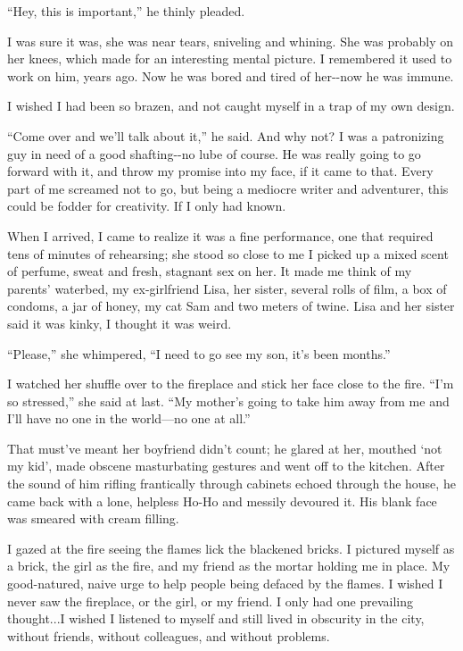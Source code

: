 ``Hey, this is important,'' he thinly pleaded.

I was sure it was, she was near tears, sniveling and whining. She was
probably on her knees, which made for an interesting mental picture. I
remembered it used to work on him, years ago. Now he was bored and tired
of her-\/-now he was immune.

I wished I had been so brazen, and not caught myself in a trap of my own
design.

``Come over and we'll talk about it,'' he said. And why not? I was a
patronizing guy in need of a good shafting-\/-no lube of course. He was
really going to go forward with it, and throw my promise into my face,
if it came to that. Every part of me screamed not to go, but being a
mediocre writer and adventurer, this could be fodder for creativity. If
I only had known.

When I arrived, I came to realize it was a fine performance, one that
required tens of minutes of rehearsing; she stood so close to me I
picked up a mixed scent of perfume, sweat and fresh, stagnant sex on
her. It made me think of my parents' waterbed, my ex-girlfriend Lisa,
her sister, several rolls of film, a box of condoms, a jar of honey, my
cat Sam and two meters of twine. Lisa and her sister said it was kinky,
I thought it was weird.

``Please,'' she whimpered, ``I need to go see my son, it's been
months.''

I watched her shuffle over to the fireplace and stick her face close to
the fire. ``I'm so stressed,'' she said at last. ``My mother's going to
take him away from me and I'll have no one in the world---no one at
all.''

That must've meant her boyfriend didn't count; he glared at her, mouthed
`not my kid', made obscene masturbating gestures and went off to the
kitchen. After the sound of him rifling frantically through cabinets
echoed through the house, he came back with a lone, helpless Ho-Ho and
messily devoured it. His blank face was smeared with cream filling.

I gazed at the fire seeing the flames lick the blackened bricks. I
pictured myself as a brick, the girl as the fire, and my friend as the
mortar holding me in place. My good-natured, naive urge to help people
being defaced by the flames. I wished I never saw the fireplace, or the
girl, or my friend. I only had one prevailing thought...I wished I
listened to myself and still lived in obscurity in the city, without
friends, without colleagues, and without problems.

